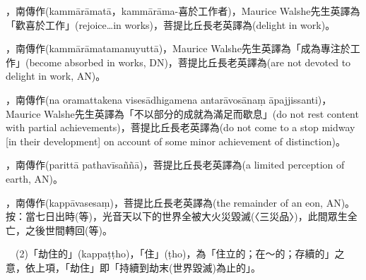 \startitemgroup[noteitems]
\item{}，南傳作(kammārāmatā，kammārāma-喜於工作者)，Maurice Walshe先生英譯為「歡喜於工作」(rejoice…in works)，菩提比丘長老英譯為(delight in work)。
\stopitemgroup

\startitemgroup[noteitems]
\item{}，南傳作(kammārāmatamanuyuttā)，Maurice Walshe先生英譯為「成為專注於工作」(become absorbed in works, DN)，菩提比丘長老英譯為(are not devoted to delight in work, AN)。
\stopitemgroup

\startitemgroup[noteitems]
\item{}，南傳作(na oramattakena visesādhigamena antarāvosānaṃ āpajjissanti)，Maurice Walshe先生英譯為「不以部分的成就為滿足而歇息」(do not rest content with partial achievements)，菩提比丘長老英譯為(do not come to a stop midway [in their development] on account of some minor achievement of distinction)。
\stopitemgroup

\startitemgroup[noteitems]
\item{}，南傳作(parittā pathavīsaññā)，菩提比丘長老英譯為(a limited perception of earth, AN)。
\stopitemgroup

\startitemgroup[noteitems]
\item{}，南傳作(kappāvasesaṃ)，菩提比丘長老英譯為(the remainder of an eon, AN)。按：當七日出時(等)，光音天以下的世界全被大火災毀滅(〈三災品〉)，此間眾生全亡，之後世間轉回(等)。
\item{}　(2)「劫住的」(kappaṭṭho)，「住」(ṭho)，為「住立的；在～的；存續的」之意，依上項，「劫住」即「持續到劫末(世界毀滅)為止的」。
\stopitemgroup

